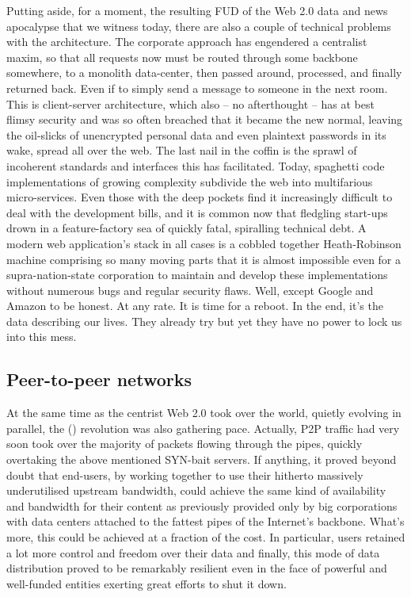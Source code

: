 Putting aside, for a moment, the resulting FUD of the Web 2.0 data and news apocalypse that we witness today, there are also a couple of technical problems with the architecture. The corporate approach has engendered a centralist maxim, so that all requests now must be routed through some backbone somewhere, to a monolith data-center, then passed around, processed, and finally returned back. Even if to simply send a message to someone in the next room. This is client-server architecture, which also – no afterthought – has at best flimsy security and was so often breached that it became the new normal, leaving the oil-slicks of unencrypted personal data and even plaintext passwords in its wake, spread all over the web. The last nail in the coffin is the sprawl of incoherent standards and interfaces this has facilitated. Today, spaghetti code implementations of growing complexity subdivide the web into multifarious micro-services. Even those with the deep pockets find it increasingly difficult to deal with the development bills, and it is common now that fledgling start-ups drown in a feature-factory sea of quickly fatal, spiralling technical debt. A modern web application's stack in all cases is a cobbled together Heath-Robinson machine comprising so many moving parts that it is almost impossible even for a supra-nation-state corporation to maintain and develop these implementations without numerous bugs and regular security flaws. Well, except Google and Amazon to be honest. At any rate. It is time for a reboot. In the end, it's the data describing our lives. They already try but yet they have no power to lock us into this mess.


\subsection{Peer-to-peer networks \statusgreen}\label{sec:peer_to_peer}

At the same time as the centrist Web 2.0 took over the world, quietly evolving in parallel, the  () revolution was also gathering pace. Actually, P2P traffic had very soon took over the majority of packets flowing through the pipes, quickly overtaking the above mentioned SYN-bait servers. If anything, it proved beyond doubt that end-users, by working together to use their hitherto massively underutilised upstream bandwidth, could achieve the same kind of availability and bandwidth for their content as previously provided only by big corporations with data centers attached to the fattest pipes of the Internet's backbone. What's more, this could be achieved at a fraction of the cost. In particular, users retained a lot more control and freedom over their data and finally, this mode of data distribution proved to be remarkably resilient even in the face of powerful and well-funded entities exerting great efforts to shut it down.

